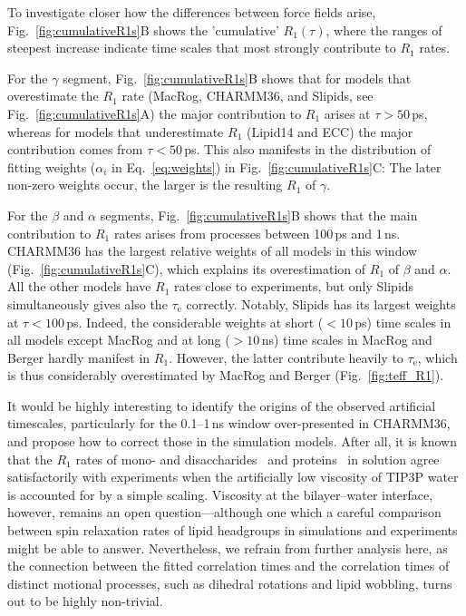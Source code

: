 \documentclass[journal=jcisd8,manuscript=article,layout=twocolumn]{achemso}
\begin{document}
To investigate closer how the differences between force fields arise, Fig.~\ref{fig:cumulativeR1s}B shows the 
'cumulative' $R_1(\tau)$, where the ranges of steepest increase indicate time scales that most strongly contribute to $R_1$ rates.

For the $\gamma$ segment,
Fig.~\ref{fig:cumulativeR1s}B shows
that for models that overestimate the $R_1$ rate 
(MacRog, CHARMM36, and Slipids, see Fig.~\ref{fig:cumulativeR1s}A)
the major contribution to $R_1$ arises at $\tau>50$\,ps, whereas for models that underestimate $R_1$ 
(Lipid14 and ECC)
the major contribution comes from $\tau<50$\,ps. 
%
This also manifests in the
distribution of fitting weights ($\alpha_i$ in Eq.~\eqref{eq:weights}) in Fig.~\ref{fig:cumulativeR1s}C:
The later non-zero weights occur, the larger is the resulting $R_1$ of $\gamma$.

For the $\beta$ and $\alpha$ segments, Fig.~\ref{fig:cumulativeR1s}B shows
that the main contribution to $R_1$ rates arises from processes
between 100\,ps and 1\,ns.
%
CHARMM36 has the largest relative weights of all models in this window (Fig.~\ref{fig:cumulativeR1s}C),
which explains its overestimation of $R_1$ of $\beta$ and $\alpha$.
%
All the other models have $R_1$ rates close to experiments,
but only Slipids simultaneously gives also the $\tau_\mathrm e$ correctly.
Notably, Slipids has its largest weights at $\tau<100$\,ps.
%
Indeed, the considerable weights
at short ($<10$\,ps) time scales  in all models except MacRog and
at long ($>10$\,ns) time scales in %
MacRog and Berger hardly manifest in $R_1$.
%
However, the latter contribute heavily to $\tau_\mathrm e$,
which is thus considerably overestimated by MacRog and Berger (Fig.~\ref{fig:teff_R1}).

It would be highly interesting to identify the origins of the observed artificial timescales,
particularly for the 0.1--1\,ns window over-presented in CHARMM36, and
propose how to correct those in the simulation models.
%
After all, it is known that the $R_1$ rates of mono- and disaccharides~\cite{Venable:2010a}
and proteins~\cite{Ollila:2018a} in solution agree satisfactorily with
experiments when the artificially low viscosity of TIP3P water is accounted for by a simple scaling.
%
Viscosity at the bilayer--water interface, however, remains an open question---although one which
a careful comparison between spin relaxation rates of lipid headgroups in simulations
and experiments might be able to answer.
%
Nevertheless, we refrain from further analysis here, as the connection between the fitted correlation times and the correlation times of distinct motional processes, such as dihedral rotations and lipid wobbling, turns out to be highly non-trivial.
\end{document}
